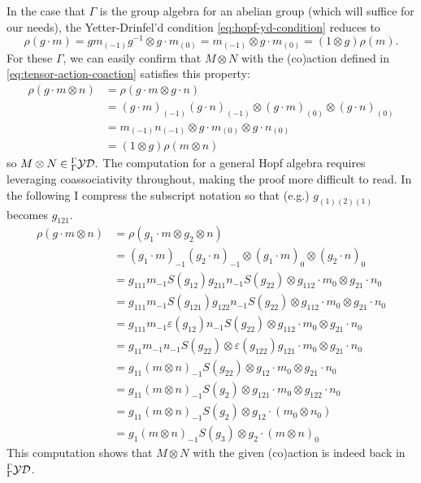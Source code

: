 \documentclass [11pt, proquest] {uwthesis}[2020/02/24]
\begin{document}
    In the case that $\Gamma$ is the group algebra for an abelian group (which will suffice for our needs), the Yetter-Drinfel'd condition \eqref{eq:hopf-yd-condition} reduces to
    \[\rho(g\cdot m)=gm_{(-1)}g^{-1}\otimes g\cdot m_{(0)}=m_{(-1)}\otimes g\cdot m_{(0)}=(1\otimes g)\rho(m).\]
    For these $\Gamma$, we can easily confirm that $M\otimes N$ with the (co)action defined in \eqref{eq:tensor-action-coaction} satisfies this property:
    \begin{align*}
        \rho(g\cdot m\otimes n)&= \rho(g\cdot m\otimes g\cdot n)\\
        &= (g\cdot m)_{(-1)}(g\cdot n)_{(-1)}\otimes (g\cdot m)_{(0)}\otimes (g\cdot n)_{(0)}\\
        &= m_{(-1)}n_{(-1)}\otimes g\cdot m_{(0)}\otimes g\cdot n_{(0)}\\
        &= (1\otimes g)\rho(m\otimes n)
    \end{align*}
    so $M\otimes N\in{^\Gamma_\Gamma\mathcal{YD}}.$ The computation for a general Hopf algebra requires leveraging coassociativity throughout, making the proof more difficult to read. In the following I compress the subscript notation so that (e.g.) $g_{(1)(2)(1)}$ becomes $g_{121}.$
    \begin{align*}
        \rho(g\cdot m\otimes n)&=\rho(g_1\cdot m\otimes g_2\otimes n)\\
        &=(g_1\cdot m)_{-1}(g_2\cdot n)_{-1}\otimes (g_1\cdot m)_0\otimes (g_2\cdot n)_0\\
        &=g_{111}m_{-1}S(g_{12})g_{211}n_{-1}S(g_{22})\otimes g_{112}\cdot m_0\otimes g_{21}\cdot n_0\\
        &= g_{111}m_{-1}S(g_{121})g_{122}n_{-1}S(g_{22})\otimes g_{112}\cdot m_0\otimes g_{21}\cdot n_0\\
        &=g_{111}m_{-1}\varepsilon(g_{12})n_{-1}S(g_{22})\otimes g_{112}\cdot m_0\otimes g_{21}\cdot n_0\\
        &=g_{11}m_{-1}n_{-1}S(g_{22})\otimes \varepsilon(g_{122})g_{121}\cdot m_0\otimes g_{21}\cdot n_0\\
        &=g_{11}(m\otimes n)_{-1}S(g_{22})\otimes g_{12}\cdot m_0\otimes g_{21}\cdot n_0\\
        &=g_{11}(m\otimes n)_{-1}S(g_{2})\otimes g_{121}\cdot m_0\otimes g_{122}\cdot n_0\\
        &=g_{11}(m\otimes n)_{-1}S(g_{2})\otimes g_{12}\cdot (m_0\otimes n_0)\\
        &=g_1(m\otimes n)_{-1}S(g_3)\otimes g_2\cdot(m\otimes n)_0
    \end{align*}
    This computation shows that $M\otimes N$ with the given (co)action is indeed back in ${^\Gamma_\Gamma\mathcal{YD}}$.
    
\end{document}
